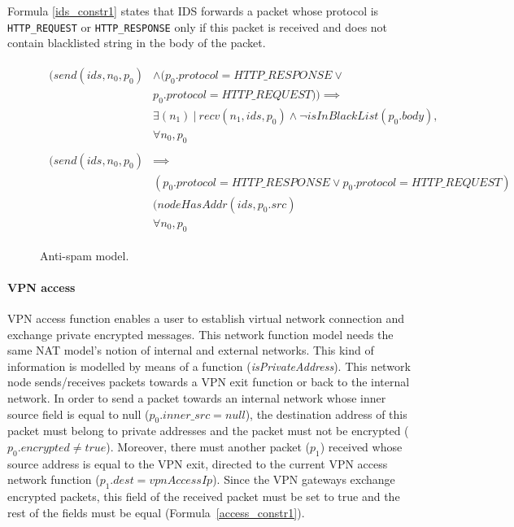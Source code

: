 Formula \ref{ids_constr1} states that IDS forwards a packet whose protocol is \texttt{HTTP\_REQUEST} or \texttt{HTTP\_RESPONSE} only if this packet is received and does not contain blacklisted string in the body of the packet.
\begin{figure}[h]
	{\footnotesize
		\begin{subequations}
			\begin{align}
				\begin{split}
					\label{ids_constr1}
					(send(ids, n_{0}, p_{0}) & \wedge (p_{0}.protocol = HTTP\_RESPONSE \vee \\
					& p_{0}.protocol = HTTP\_REQUEST)) \implies \\
					& \exists (n_{1}) \: | \:  recv(n_{1}, ids, p_{0}) \wedge \neg isInBlackList(p_{0}.body), \\
					& \forall n_{0}, p_{0}
				\end{split} \\
				\begin{split}
					\label{ids_constr2}
					(send(ids, n_{0}, p_{0})& \implies  \\
					& (p_{0}.protocol = HTTP\_RESPONSE \vee  p_{0}.protocol = HTTP\_REQUEST) \\ 
					& (nodeHasAddr(ids, p_{0}.src) \\
					& \forall n_{0}, p_{0}
				\end{split}
			\end{align}
		\end{subequations}
	}%
	\caption{Anti-spam model.}
	\label{anti-spam_model}
\end{figure}

\paragraph{VPN access}
VPN access function enables a user to establish virtual network connection and exchange private encrypted messages. This network function model needs the same NAT model's  notion of internal and external networks. This kind of information is modelled by means of a function (\textit{isPrivateAddress}). This network node sends/receives packets towards a VPN exit function or back to the internal network. In order to send a packet towards an internal network whose inner source field is equal to null ($p_{0}.inner\_src=null$), the destination address of this packet must belong to private addresses and the packet must not be encrypted ($p_{0}.encrypted \neq true$). Moreover, there must another packet ($ p_{1}$) received whose source address is equal to the VPN exit, directed to the current VPN access network function ($p_{1}.dest = vpnAccessIp$). Since the VPN gateways exchange encrypted packets, this field of the received packet must be set to true and the rest of the fields must be equal (Formula~\ref{access_constr1}).



